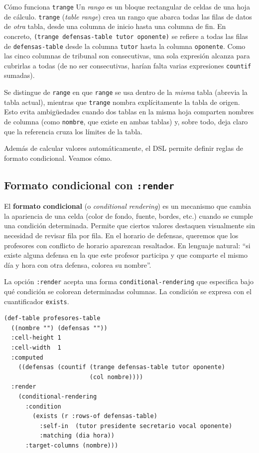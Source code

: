 \documentclass[12pt,a4paper]{report}
\begin{document}
\begin{infobox}{Cómo funciona \texttt{trange}}
Un \emph{rango} es un bloque rectangular de celdas de una hoja de cálculo.
\texttt{trange} (\emph{table range}) crea un rango que abarca todas las
filas de datos de \emph{otra} tabla, desde una columna de inicio hasta una
columna de fin.  En concreto,
\texttt{(trange defensas-table tutor oponente)} se refiere a todas las
filas de \texttt{defensas-table} desde la columna \texttt{tutor} hasta la
columna \texttt{oponente}.  Como las cinco columnas de tribunal son
consecutivas, una sola expresión alcanza para cubrirlas a todas (de no
ser consecutivas, harían falta varias expresiones \texttt{countif}
sumadas).

Se distingue de \texttt{range} en que \texttt{range} se usa dentro de la
\emph{misma} tabla (abrevia la tabla actual), mientras que
\texttt{trange} nombra explícitamente la tabla de origen.  Esto evita
ambigüedades cuando dos tablas en la misma hoja comparten nombres de
columna (como \texttt{nombre}, que existe en ambas tablas) y, sobre
todo, deja claro que la referencia cruza los límites de la tabla.
\end{infobox}

Además de calcular valores automáticamente, el DSL permite
definir reglas de formato condicional.  Veamos cómo.

\subsection{Formato condicional con \texttt{:render}}

El \textbf{formato condicional} (o \emph{conditional rendering}) es un
mecanismo que cambia la apariencia de una celda (color de fondo, fuente,
bordes, etc.) cuando se cumple una condición determinada.  Permite que
ciertos valores destaquen visualmente sin necesidad de revisar fila por
fila.  En el horario de defensas, queremos que los profesores con
conflicto de horario aparezcan resaltados.  En lenguaje natural: ``si
existe alguna defensa en la que este profesor participa y que comparte
el mismo día y hora con otra defensa, colorea su nombre''.

La opción \texttt{:render} acepta una forma \texttt{conditional-rendering}
que especifica bajo qué condición se colorean determinadas columnas.
La condición se expresa con el cuantificador \texttt{exists}.

\begin{lstlisting}[caption={Formato condicional sobre profesores-table.}]
(def-table profesores-table
  ((nombre "") (defensas ""))
  :cell-height 1
  :cell-width  1
  :computed
    ((defensas (countif (trange defensas-table tutor oponente)
                        (col nombre))))
  :render
    (conditional-rendering
      :condition
        (exists (r :rows-of defensas-table)
          :self-in  (tutor presidente secretario vocal oponente)
          :matching (dia hora))
      :target-columns (nombre)))
\end{lstlisting}
\end{document}
